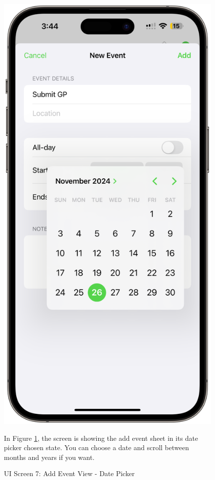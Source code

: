\begin{figure}[!h]
    \begin{minipage}{0.3\textwidth}
        \centering
        \includegraphics[width=\textwidth]{images/screen7.png}
        \caption{UI Screen 7: Add Event View - Date Picker}
        \label{fig:ui-screen-7}
    \end{minipage}
    \hfill
    \begin{minipage}{0.65\textwidth}
        In Figure \ref{fig:ui-screen-7}, the screen is showing the add event sheet in its date picker chosen state. You can choose a date and scroll between months and years if you want.
    \end{minipage}
\end{figure}

